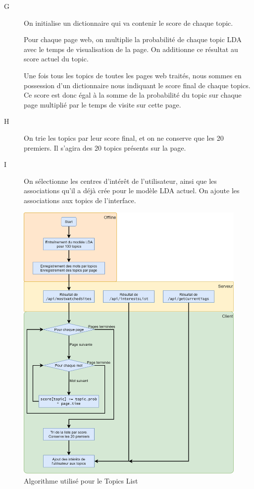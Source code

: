 \begin{description}
				\item[G] On initialise un dictionnaire qui va contenir le score de chaque topic.
				
				Pour chaque page web, on multiplie la probabilité de chaque topic LDA avec le temps de visualisation de la page. On additionne ce résultat au score actuel du topic.
				
				Une fois tous les topics de toutes les pages web traités, nous sommes en possession d'un dictionnaire nous indiquant le score final de chaque topics. Ce score est donc égal à la somme de la probabilité du topic sur chaque page multiplié par le temps de visite sur cette page.
				
				\item[H] On trie les topics par leur score final, et on ne conserve que les 20 premiers. Il s'agira des 20 topics présents sur la page.

				\item[I] On sélectionne les centres d'intérêt de l'utilisateur, ainsi que les associations qu'il a déjà crée pour le modèle LDA actuel. On ajoute les associations aux topics de l'interface.
			\end{description}

			\begin{figure}[!h]
				\centering
				\includegraphics[height=1.35\textwidth]{images/design/pages/topics_algo}
				\caption{Algorithme utilisé pour le Topics List}
				\label{topics_algo}
			\end{figure}

